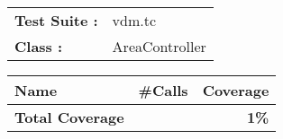 





















































\begin{tabular}{p{25mm}l}
{\bf Test Suite :} & vdm.tc \\ 
{\bf Class :} & AreaController \\ 
\end{tabular}

\begin{longtable}{|l|r|r|}\hline
{\bf Name} & {\bf \#Calls} & {\bf Coverage} \\ \hline\hline
\endhead
\hline
{\bf Total Coverage} & & {\bf 1\%} \\ \hline
\end{longtable}

